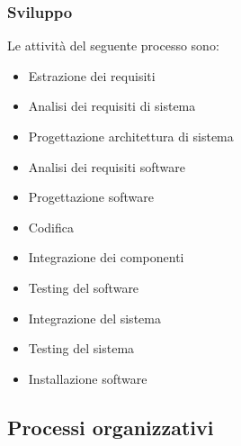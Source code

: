 \subsubsection{Sviluppo}
Le attività del seguente processo sono:
\begin{itemize}
    \item Estrazione dei requisiti
    \item Analisi dei requisiti di sistema
    \item Progettazione architettura di sistema
    \item Analisi dei requisiti software
    \item Progettazione software
    \item Codifica
    \item Integrazione dei componenti
    \item Testing del software
    \item Integrazione del sistema
    \item Testing del sistema
    \item Installazione software
\end{itemize}
\newpage
\subsection{Processi organizzativi}

